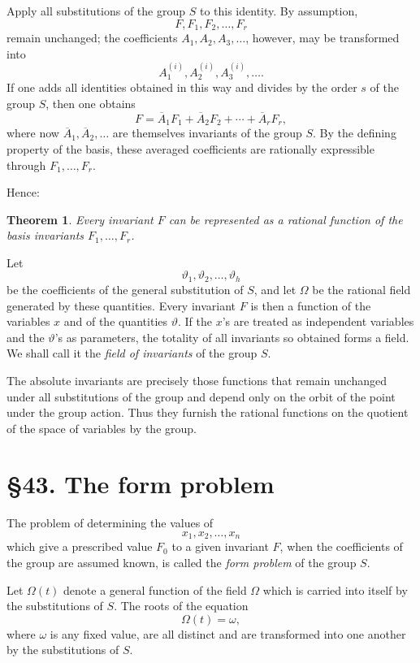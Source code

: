 \documentclass[11pt]{article}
\newcommand{\webersection}[2]{\section*{\S #1. #2}\addcontentsline{toc}{section}{\S #1. #2}}
\newtheorem*{satz}{Theorem}
\begin{document}
Apply all substitutions of the group \(S\) to this identity.  By assumption,
\[
F,F_1,F_2,\ldots,F_r
\]
remain unchanged; the coefficients \(A_1,A_2,A_3,\ldots\), however, may be transformed into
\[
A_1^{(i)},A_2^{(i)},A_3^{(i)},\ldots .
\]
If one adds all identities obtained in this way and divides by the order \(s\) of the group \(S\), then one obtains
\begin{equation}
F=\overline A_1F_1+\overline A_2F_2+\cdots+\overline A_rF_r,
\end{equation}
where now \(\overline A_1,\overline A_2,\ldots\) are themselves invariants of the group \(S\).  By the defining property of the basis, these averaged coefficients are rationally expressible through \(F_1,\ldots,F_r\).

Hence:

\begin{satz}
Every invariant \(F\) can be represented as a rational function of the basis invariants \(F_1,\ldots,F_r\).
\end{satz}

Let
\[
\vartheta_1,\vartheta_2,\ldots,\vartheta_h
\]
be the coefficients of the general substitution of \(S\), and let \(\Omega\) be the rational field generated by these quantities.  Every invariant \(F\) is then a function of the variables \(x\) and of the quantities \(\vartheta\).  If the \(x\)'s are treated as independent variables and the \(\vartheta\)'s as parameters, the totality of all invariants so obtained forms a field.  We shall call it the \emph{field of invariants} of the group \(S\).

The absolute invariants are precisely those functions that remain unchanged under all substitutions of the group and depend only on the orbit of the point under the group action.  Thus they furnish the rational functions on the quotient of the space of variables by the group.

\webersection{43}{The form problem}

The problem of determining the values of
\[
x_1,x_2,\ldots,x_n
\]
which give a prescribed value \(F_0\) to a given invariant \(F\), when the coefficients of the group are assumed known, is called the \emph{form problem} of the group \(S\).

Let \(\Omega(t)\) denote a general function of the field \(\Omega\) which is carried into itself by the substitutions of \(S\).  The roots of the equation
\[
\Omega(t)=\omega,
\]
where \(\omega\) is any fixed value, are all distinct and are transformed into one another by the substitutions of \(S\).
\end{document}
